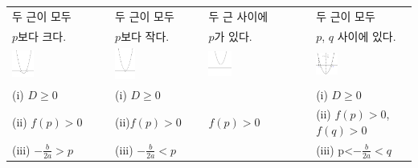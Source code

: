 \documentclass{article}
\begin{document}
\noindent
{\footnotesize
\begin{tabular}{p{}|p{}|p{}|p{}}
\hline
두 근이 모두 	&두 근이 모두		&두 근 사이에 		&두 근이 모두 \\
\(p\)보다 크다.	&\(p\)보다 작다.	&\(p\)가 있다.		&\(p\), \(q\) 사이에 있다.\\
\hline
\includegraphics[width=0.24\textwidth]{1}
&\includegraphics[width=0.24\textwidth]{2}
&\includegraphics[width=0.24\textwidth]{3}
&\includegraphics[width=0.24\textwidth]{4}\\
\hline
(i) \(D\ge0\)	&(i) \(D\ge0\)	&				&(i) \(D\ge0\)\\
(ii) \(f(p)>0\)	&(ii)\(f(p)>0\)		&\(f(p)>0\)		&(ii) \(f(p)>0\), \(f(q)>0\)\\
(iii) \(-\frac b{2a}>p\)& (iii) \(-\frac b{2a}<p\)&		&(iii) p<\(-\frac b{2a}<q\)
\end{tabular}
}
\end{document}
